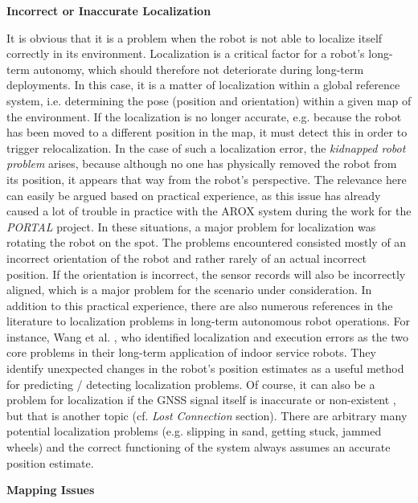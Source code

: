 \documentclass[english, master, utf8]{base/thesis_KBS}
\begin{document}
\noindent
\textbf{Incorrect or Inaccurate Localization}\newline

\noindent
It is obvious that it is a problem when the robot is not able to localize itself correctly in its environment.
Localization is a critical factor for a robot's long-term autonomy, which should therefore not deteriorate during long-term deployments. \cite{Hawes:2017}
In this case, it is a matter of localization within a global reference system, i.e. determining the pose (position and orientation) within a given map of the environment.
If the localization is no longer accurate, e.g. because the robot has been moved to a different position in the map, it must detect this in order to
trigger relocalization. In the case of such a localization error, the \textit{kidnapped robot problem} arises, because although no one has 
physically removed the robot from its position, it appears that way from the robot's perspective. \cite{Hertzberg:2012}
The relevance here can easily be argued based on practical experience, as this issue has already caused a lot of trouble in practice with the AROX system during 
the work for the \textit{PORTAL} project. In these situations, a major problem for localization was rotating the robot on the spot.
The problems encountered consisted mostly of an incorrect orientation of the robot and rather rarely of an actual incorrect position.
If the orientation is incorrect, the sensor records will also be incorrectly aligned, which is a major problem for the scenario under consideration.
In addition to this practical experience, there are also numerous references in the literature to localization problems in long-term autonomous robot operations. For instance,
Wang et al. \cite{Wang:2018}, who identified localization and execution errors as the two core problems in their long-term application of indoor service robots.
They identify unexpected changes in the robot's position estimates as a useful method for predicting / detecting localization problems.
Of course, it can also be a problem for localization if the GNSS signal itself is inaccurate or non-existent \cite{Churchill:2013}, but that is another topic (cf. \textit{Lost Connection} section).
There are arbitrary many potential localization problems (e.g. slipping in sand, getting stuck, jammed wheels) and the correct functioning of the system always assumes an accurate
position estimate. \cite{Goldberg:2002}

\vfill
\pagebreak

\noindent
\textbf{Mapping Issues}\newline
\end{document}
